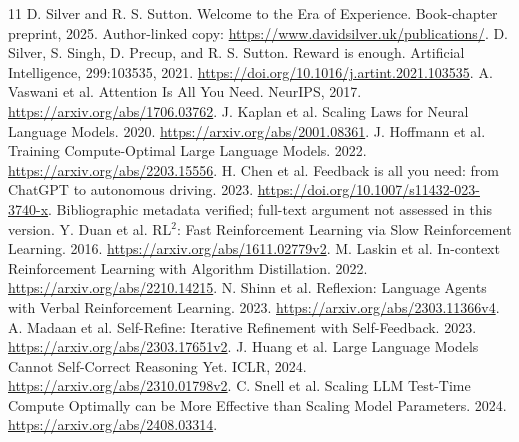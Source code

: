 \documentclass[11pt]{article}
\begin{document}
\begin{thebibliography}{11}
 D. Silver and R. S. Sutton. Welcome to the Era of Experience.
Book-chapter preprint, 2025. Author-linked copy:
\url{https://www.davidsilver.uk/publications/}.
 D. Silver, S. Singh, D. Precup, and R. S. Sutton.
Reward is enough. Artificial Intelligence, 299:103535, 2021.
\url{https://doi.org/10.1016/j.artint.2021.103535}.
 A. Vaswani et al. Attention Is All You Need. NeurIPS, 2017.
\url{https://arxiv.org/abs/1706.03762}.
 J. Kaplan et al. Scaling Laws for Neural Language Models. 2020.
\url{https://arxiv.org/abs/2001.08361}.
 J. Hoffmann et al. Training Compute-Optimal Large Language Models. 2022.
\url{https://arxiv.org/abs/2203.15556}.
 H. Chen et al. Feedback is all you need: from ChatGPT to autonomous driving. 2023.
\url{https://doi.org/10.1007/s11432-023-3740-x}. Bibliographic metadata verified;
full-text argument not assessed in this version.
 Y. Duan et al. RL$^2$: Fast Reinforcement Learning via Slow Reinforcement Learning. 2016.
\url{https://arxiv.org/abs/1611.02779v2}.
 M. Laskin et al. In-context Reinforcement Learning with Algorithm Distillation. 2022.
\url{https://arxiv.org/abs/2210.14215}.
 N. Shinn et al. Reflexion: Language Agents with Verbal Reinforcement Learning. 2023.
\url{https://arxiv.org/abs/2303.11366v4}.
 A. Madaan et al. Self-Refine: Iterative Refinement with Self-Feedback. 2023.
\url{https://arxiv.org/abs/2303.17651v2}.
 J. Huang et al. Large Language Models Cannot Self-Correct Reasoning Yet. ICLR, 2024.
\url{https://arxiv.org/abs/2310.01798v2}.
 C. Snell et al. Scaling LLM Test-Time Compute Optimally can be More Effective than Scaling Model Parameters. 2024.
\url{https://arxiv.org/abs/2408.03314}.
\end{thebibliography}
\end{document}
